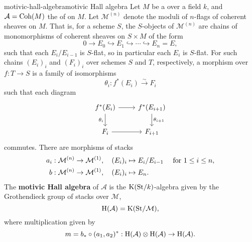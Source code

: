 \begin{topic}{motivic-hall-algebra}{motivic Hall algebra}
    Let $M$ be a   over a field $k$, and $\mathcal{A} = \textup{Coh}(M)$ the  of  on $M$. Let $\mathcal{M}^{(n)}$ denote the moduli  of $n$-flags of coherent sheaves on $M$. That is, for a scheme $S$, the $S$-objects of $\mathcal{M}^{(n)}$ are chains of monomorphisms of coherent sheaves on $S \times M$ of the form
    \[ 0 \to E_0 \hookrightarrow E_1 \hookrightarrow \cdots \hookrightarrow E_n = E , \]
    such that each $E_i/E_{i - 1}$ is $S$-flat, so in particular each $E_i$ is $S$-flat. For such chains $(E_i)_i$ and $(F_i)_i$ over schemes $S$ and $T$, respectively, a morphism over $f : T \to S$ is a family of isomorphisms
    \[ \theta_i : f^*(E_i) \xrightarrow{\sim} F_i \]
    such that each diagram
    \[ \begin{tikzcd} f^*(E_i) \arrow[swap]{d}{\theta_i} \arrow{r} & f^*(E_{i + 1}) \arrow{d}{\theta_{i + 1}} \\ F_i \arrow{r} & F_{i + 1} \end{tikzcd} \]
    commutes.
    There are morphisms of stacks
    \[ \begin{aligned}
        a_i &: \mathcal{M}^{(n)} \to \mathcal{M}^{(1)}, \quad (E_i)_i \mapsto E_i/E_{i - 1} \quad \textup{ for } 1 \le i \le n , \\
        b &: \mathcal{M}^{(n)} \to \mathcal{M}^{(1)}, \quad (E_i)_i \mapsto E_n .
    \end{aligned} \]
    The \textbf{motivic Hall algebra} of $\mathcal{A}$ is the $\textup{K}(\textup{St}/k)$-algebra given by the Grothendieck group of stacks over $\mathcal{M}$,
    \[ \textup{H}(\mathcal{A}) = \textup{K}(\textup{St}/\mathcal{M}) , \]
    where multiplication given by
    \[ m = b_* \circ (a_1, a_2)^* : \textup{H}(\mathcal{A}) \otimes \textup{H}(\mathcal{A}) \to \textup{H}(\mathcal{A}) . \]
\end{topic}

